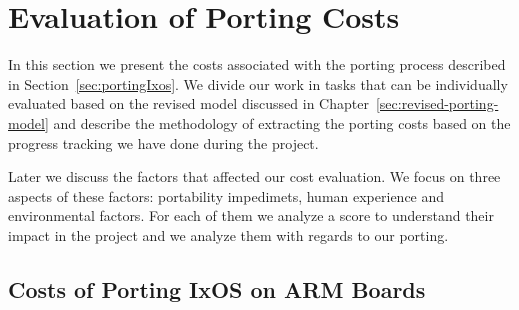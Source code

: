 \newcommand\multirowline[1]{\begin{tabular}{@{}c@{}}#1\end{tabular}}

\chapter{Evaluation of Porting Costs} \label{sec:eval}

%
%
%

In this section we present the costs associated with the porting process
described in Section~\ref{sec:portingIxos}. We divide our work in tasks
that can be individually evaluated based on the revised model discussed in
Chapter~\ref{sec:revised-porting-model} and describe the methodology of
extracting the porting costs based on the progress tracking we have done during
the project.

Later we discuss the factors that affected our cost evaluation. We focus on
three aspects of these factors: portability impedimets, human experience and
environmental factors. For each of them we analyze a score to understand their
impact in the project and we analyze them with regards to our porting.

\section{Costs of Porting IxOS on ARM Boards}

